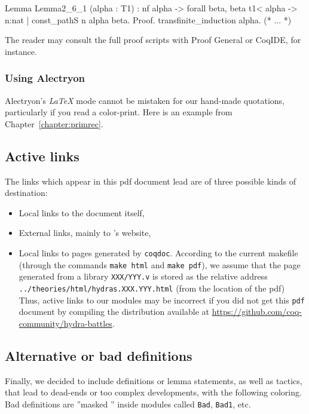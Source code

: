 \documentclass[a4paper]{book}
\begin{document}
\begin{Coqsrc}
Lemma Lemma2_6_1 (alpha : T1) :  
  nf alpha -> forall beta,  beta t1< alpha  ->
  {n:nat | const_pathS n alpha beta}.
Proof.
  transfinite_induction alpha.
  (* ... *)
\end{Coqsrc}

The reader may consult the full proof scripts with Proof General or CoqIDE, for instance.

\subsubsection{Using Alectryon}

Alectryon's \emph{LaTeX} mode cannot be mistaken for our hand-made quotations, particularly if you read a color-print.
Here is an example from Chapter~\ref{chapter:primrec}.

\vspace{4pt}



\subsection{Active links}
The  links which appear in this pdf  document lead are of three possible kinds of destination:
\begin{itemize}
\item Local links to the document itself,
\item External links, mainly to \coq's website,
\item Local links to pages generated by \texttt{coqdoc}. According to the current makefile (through the commands \texttt{make html} and \texttt{make pdf}), 
  we assume that the page generated from a library \texttt{XXX/YYY.v} is stored as
the relative address \texttt{../theories/html/hydras.XXX.YYY.html} (from the location of the pdf)
Thus,  active links to our \coq{} modules may be incorrect if you did not get this \texttt{pdf} document by compiling the distribution available at
\url{https://github.com/coq-community/hydra-battles}.

\end{itemize}

\subsection{Alternative or bad definitions}
\label{sect:alt-proofs}
Finally, we decided to include definitions or lemma statements, as well as tactics,  that lead to
dead-ends or too complex developments, with the following coloring.
Bad definitions 
 are ''masked '' inside modules called \texttt{Bad}, \texttt{Bad1}, etc.
\end{document}
